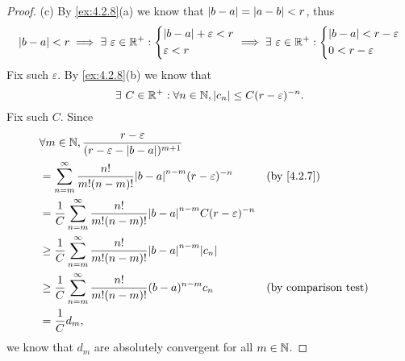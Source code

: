 \begin{proof}{(c)}
  By \cref{ex:4.2.8}(a) we know that \(\left\lvert b - a\right\rvert = \left\lvert a - b\right\rvert < r\), thus
  \[
    \left\lvert b - a\right\rvert < r \implies \exists\ \varepsilon \in \mathbb{R}^+ : \begin{dcases}
      \left\lvert b - a\right\rvert + \varepsilon < r \\
      \varepsilon < r
    \end{dcases} \implies \exists\ \varepsilon \in \mathbb{R}^+ : \begin{dcases}
      \left\lvert b - a\right\rvert < r - \varepsilon \\
      0 < r - \varepsilon
    \end{dcases}
  \]
  Fix such \(\varepsilon\).
  By \cref{ex:4.2.8}(b) we know that
  \[
    \exists\ C \in \mathbb{R}^+ : \forall n \in \mathbb{N}, \left\lvert c_n\right\rvert \leq C (r - \varepsilon)^{-n}.
  \]
  Fix such \(C\).
  Since
  \begin{align*}
     & \forall m \in \N, \dfrac{r - \varepsilon}{(r - \varepsilon - \abs{b - a})^{m + 1}}                                                       \\
     & = \sum_{n = m}^\infty \dfrac{n!}{m! (n - m)!} \abs{b - a}^{n - m} (r - \varepsilon)^{-n}                &  & \by{4.2.7}                  \\
     & = \dfrac{1}{C} \sum_{n = m}^\infty \dfrac{n!}{m! (n - m)!} \abs{b - a}^{n - m} C (r - \varepsilon)^{-n}                                  \\
     & \geq \dfrac{1}{C} \sum_{n = m}^\infty \dfrac{n!}{m! (n - m)!} \abs{b - a}^{n - m} \abs{c_n}                                              \\
     & \geq \dfrac{1}{C} \sum_{n = m}^\infty \dfrac{n!}{m! (n - m)!} (b - a)^{n - m} c_n                       &  & \text{(by comparison test)} \\
     & = \dfrac{1}{C} d_m,
  \end{align*}
  we know that \(d_m\) are absolutely convergent for all \(m \in \mathbb{N}\).
\end{proof}


